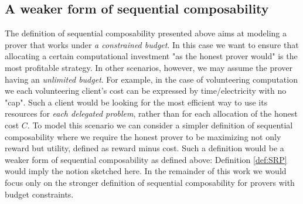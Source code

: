 \subsection{A weaker form of sequential composability}


The definition of sequential composability presented above aims at modeling a prover that works under \emph{a constrained budget}. In this case we want to ensure that allocating a certain computational investment "as the honest prover would" is the most profitable strategy.
In other scenarios, however, we may assume the prover having an \emph{unlimited budget}. For example, in the case of volunteering computation we each volunteering client's cost can be expressed by time/electricity with no "cap". Such a client would be looking for the most efficient way to use its resources for \emph{each delegated problem}, rather than for each allocation of the honest cost $C$.
To model this scenario we can consider a simpler definition of sequential composability where we require the honest prover to be maximizing not only reward but utility, defined as reward minus cost. 
Such a definition would be a weaker form of sequential composability as defined above: Definition \ref{def:SRP} would imply the notion sketched here. In the remainder of this work we would focus only on the stronger definition of sequential composability for provers with budget constraints.

